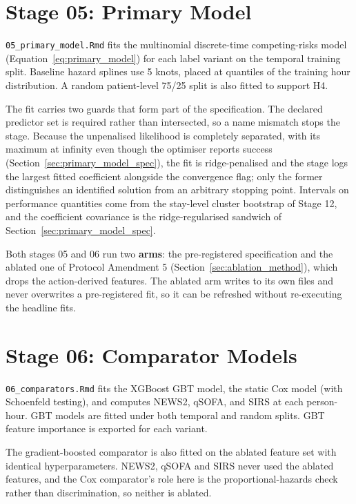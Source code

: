 \section{Stage 05: Primary Model}

\texttt{05\_primary\_model.Rmd} fits the multinomial discrete-time
competing-risks model (Equation~\ref{eq:primary_model}) for each label variant
on the temporal training split. Baseline hazard splines use 5 knots, placed at
quantiles of the training hour distribution. A random patient-level 75/25 split
is also fitted to support H4.

The fit carries two guards that form part of the specification. The declared
predictor set is required rather than intersected, so a name mismatch stops the
stage. Because the unpenalised likelihood is completely separated, with its
maximum at infinity even though the optimiser reports success
(Section~\ref{sec:primary_model_spec}), the fit is ridge-penalised and the stage
logs the largest fitted coefficient alongside the convergence flag; only the
former distinguishes an identified solution from an arbitrary stopping point.
Intervals on performance quantities come from the stay-level cluster bootstrap
of Stage 12, and the coefficient covariance is the ridge-regularised sandwich
of Section~\ref{sec:primary_model_spec}.

Both stages 05 and 06 run two \textbf{arms}: the pre-registered specification
and the ablated one of Protocol Amendment 5
(Section~\ref{sec:ablation_method}), which drops the action-derived features.
The ablated arm writes to its own files and never overwrites a pre-registered
fit, so it can be refreshed without re-executing the headline fits.


\section{Stage 06: Comparator Models}

\texttt{06\_comparators.Rmd} fits the XGBoost GBT model, the static Cox model
(with Schoenfeld testing), and computes NEWS2, qSOFA, and SIRS at each
person-hour. GBT models are fitted under both temporal and random splits. GBT
feature importance is exported for each variant.

The gradient-boosted comparator is also fitted on the ablated feature
set with identical hyperparameters. NEWS2, qSOFA and SIRS never used the
ablated features, and the Cox comparator's role here is the
proportional-hazards check rather than discrimination, so neither is ablated.


